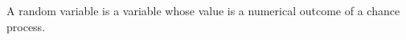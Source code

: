 \documentclass[preview]{standalone}
\begin{document}
\begin{center}
A random variable is a variable whose value is a numerical outcome of a chance process.
\end{center}
\end{document}
